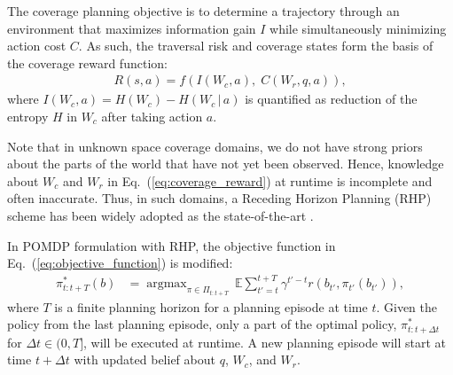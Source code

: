 \documentclass[letterpaper]{article} %
\newcommand{\ph}[1]{{\textbf{#1}:}} %
\newcommand{\phdone}[1]{} %
\newcommand{\argmax}{\mathop{\mathrm{argmax}}}
\begin{document}
The coverage planning objective is to determine a trajectory through an environment that maximizes information gain $I$ while simultaneously minimizing action cost $C$. As such, the traversal risk and coverage states form the basis of the coverage reward function:
\begin{align}
  R(s, a) = f(I(W_{c}, a),\; C(W_{r}, q, a)),
  \label{eq:coverage_reward}
\end{align}
where $I(W_{c}, a) = H(W_{c}) - H(W_{c} \,|\, a)$ is quantified as reduction of the entropy $H$ in $W_{c}$ after taking action $a$. 
%
%
\phdone{Receding Horizon Planning}
Note that in unknown space coverage domains, we do not have strong priors about the parts of the world that have not yet been observed. Hence, knowledge about $W_{c}$ and $W_{r}$ in Eq.~(\ref{eq:coverage_reward}) at runtime is incomplete and often inaccurate.
%
Thus, in such domains, a Receding Horizon Planning (RHP) scheme has been widely adopted as the state-of-the-art \cite{bircher2016receding}.

\phdone{RHP Objective Function}
In POMDP formulation with RHP, the objective function in Eq.~(\ref{eq:objective_function}) is modified:
\begin{align}
  \pi_{t:t+T}^*(b) &= \argmax_{\pi \in \Pi_{t:t+T}} \, \mathbb{E} \sum_{t'=t}^{t+T} \gamma^{t'-t} r(b_{t'}, \pi_{t'}(b_{t'})),
  \label{eq:receding_objective_function}
\end{align}
where $T$ is a finite planning horizon for a planning episode at time $t$.
Given the policy from the last planning episode, only a part of the optimal policy, $\pi^*_{t:t+\Delta t}$ for $\Delta t \in (0, T]$, will be executed at runtime. A new planning episode will start at time $t+\Delta t$ with updated belief about $q$, $W_{c}$, and $W_{r}$.
\end{document}
